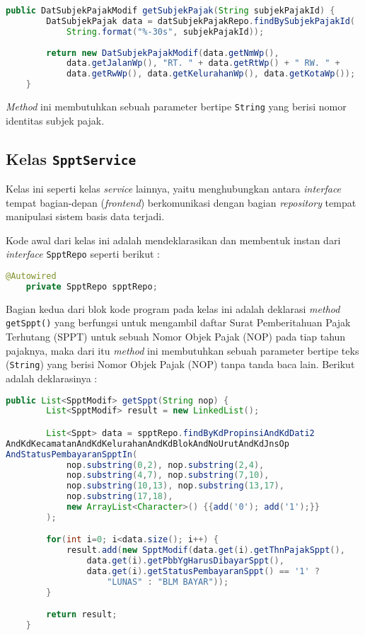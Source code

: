 \documentclass[pdftex,12pt, oneside]{article}
\begin{document}
\begin{lstlisting}[language=java]
    public DatSubjekPajakModif getSubjekPajak(String subjekPajakId) {
        DatSubjekPajak data = datSubjekPajakRepo.findBySubjekPajakId(
            String.format("%-30s", subjekPajakId));
        
        return new DatSubjekPajakModif(data.getNmWp(), 
            data.getJalanWp(), "RT. " + data.getRtWp() + " RW. " + 
            data.getRwWp(), data.getKelurahanWp(), data.getKotaWp());
    }
\end{lstlisting}

\textit{Method} ini membutuhkan sebuah parameter bertipe \texttt{String} yang berisi nomor identitas subjek pajak.

\subsection{Kelas \texttt{SpptService}}

Kelas ini seperti kelas \textit{service} lainnya, yaitu menghubungkan antara \textit{interface} tempat bagian-depan (\textit{frontend}) berkomunikasi dengan bagian \textit{repository} tempat manipulasi sistem basis data terjadi.

Kode awal dari kelas ini adalah mendeklarasikan dan membentuk instan dari \textit{interface} \texttt{SpptRepo} seperti berikut :

\begin{lstlisting}[language=java]
    @Autowired
    private SpptRepo spptRepo;
\end{lstlisting}

Bagian kedua dari blok kode program pada kelas ini adalah deklarasi \textit{method} \texttt{getSppt()} yang berfungsi untuk mengambil daftar Surat Pemberitahuan Pajak Terhutang (SPPT) untuk sebuah Nomor Objek Pajak (NOP) pada tiap tahun pajaknya, maka dari itu \textit{method} ini membutuhkan sebuah parameter bertipe teks (\texttt{String}) yang berisi Nomor Objek Pajak (NOP) tanpa tanda baca lain. Berikut adalah deklarasinya :

\begin{lstlisting}[language=java]
    public List<SpptModif> getSppt(String nop) {
        List<SpptModif> result = new LinkedList();

        List<Sppt> data = spptRepo.findByKdPropinsiAndKdDati2
AndKdKecamatanAndKdKelurahanAndKdBlokAndNoUrutAndKdJnsOp
AndStatusPembayaranSpptIn(
            nop.substring(0,2), nop.substring(2,4), 
            nop.substring(4,7), nop.substring(7,10), 
            nop.substring(10,13), nop.substring(13,17), 
            nop.substring(17,18), 
            new ArrayList<Character>() {{add('0'); add('1');}}
        );

        for(int i=0; i<data.size(); i++) {
            result.add(new SpptModif(data.get(i).getThnPajakSppt(), 
                data.get(i).getPbbYgHarusDibayarSppt(),
                data.get(i).getStatusPembayaranSppt() == '1' ? 
                    "LUNAS" : "BLM BAYAR"));
        }

        return result;
    }
\end{lstlisting}
\end{document}
